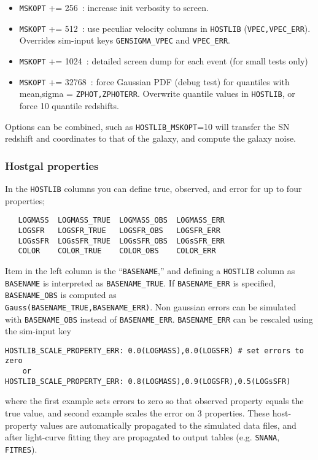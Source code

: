\documentclass[12pt]{article}
\begin{document}
{\begin{itemize}
%
\item {\tt MSKOPT} += 256~: increase init verbosity to screen.
%
\item {\tt MSKOPT} += 512~: use peculiar velocity columns in {\tt HOSTLIB}
       ({\tt VPEC,VPEC\_ERR}). \\
       Overrides sim-input keys {\tt GENSIGMA\_VPEC} and {\tt VPEC\_ERR}.
%
\item {\tt MSKOPT} += 1024~: detailed screen dump
        for each event (for small tests only)
%
\item {\tt MSKOPT} += 32768~: force Gaussian PDF (debug test) for quantiles with
        mean,sigma = {\tt ZPHOT,ZPHOTERR}. Overwrite quantile values in 
        {\tt HOSTLIB}, or force 10 quantile redshifts.
%
\end{itemize}
%
Options can be combined, such as {\tt HOSTLIB\_MSKOPT}=10
will transfer the SN redshift and coordinates to that of
the galaxy, and compute the galaxy noise.

\subsubsection{Hostgal properties}
\label{sss:hostgal_properties}
In the {\tt HOSTLIB} columns you can define true, observed, and error 
for up to four properties;
\begin{verbatim}
   LOGMASS  LOGMASS_TRUE  LOGMASS_OBS  LOGMASS_ERR 
   LOGSFR   LOGSFR_TRUE   LOGSFR_OBS   LOGSFR_ERR
   LOGsSFR  LOGsSFR_TRUE  LOGsSFR_OBS  LOGsSFR_ERR
   COLOR    COLOR_TRUE    COLOR_OBS    COLOR_ERR
\end{verbatim}
%
Item in the left column is the ``{\tt BASENAME},'' and defining a {\tt HOSTLIB}
column as {\tt BASENAME} is interpreted as {\tt BASENAME\_TRUE}.
If {\tt BASENAME\_ERR} is specified, {\tt BASENAME\_OBS} is computed as \\
%
{\tt Gauss(BASENAME\_TRUE,BASENAME\_ERR)}.
%
Non gaussian errors can be simulated with {\tt BASENAME\_OBS} 
instead of {\tt BASENAME\_ERR}.
{\tt BASENAME\_ERR} can be rescaled using the sim-input key 
\begin{verbatim}    
HOSTLIB_SCALE_PROPERTY_ERR: 0.0(LOGMASS),0.0(LOGSFR) # set errors to zero
    or
HOSTLIB_SCALE_PROPERTY_ERR: 0.8(LOGMASS),0.9(LOGSFR),0.5(LOGsSFR)  
\end{verbatim}
%
where the first example sets errors to zero so that observed property 
equals the true value, and second example scales the error on 3 properties.
%
These host-property values are automatically propagated to the simulated data 
files, and after light-curve fitting they are propagated to output tables 
(e.g. {\tt SNANA}, {\tt FITRES}).

}
\end{document}
